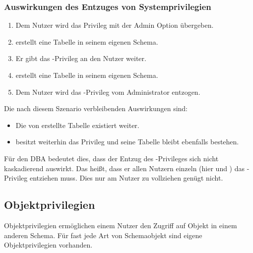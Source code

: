         \subsubsection{Auswirkungen des Entzuges von Systemprivilegien}
          \begin{enumerate}
            \item Dem Nutzer  wird das Privileg  mit der Admin Option \"ubergeben.
            \item {} erstellt eine Tabelle in seinem eigenen Schema.
            \item Er gibt das -Privileg an den Nutzer  weiter.
            \item {} erstellt eine Tabelle in seinem eigenen Schema.
            \item Dem Nutzer  wird das -Privileg vom Administrator entzogen.
          \end{enumerate}
          Die nach diesem Szenario verbleibenden Auswirkungen sind:
          \begin{itemize}
            \item Die von  erstellte Tabelle existiert weiter.
            \item {} besitzt weiterhin das Privileg  und seine Tabelle bleibt ebenfalls bestehen.
          \end{itemize}
          F\"ur den DBA bedeutet dies, dass der Entzug des -Privileges sich nicht kaskadierend auswirkt. Das hei\ss{}t, dass er allen Nutzern einzeln (hier  und ) das -Privileg entziehen muss. Dies nur am Nutzer  zu vollziehen gen\"ugt nicht.
      \subsection{Objektprivilegien}
        \begin{merke}
          Objektprivilegien erm\"oglichen einem Nutzer den Zugriff auf Objekt in einem anderen Schema. F\"ur fast jede Art von Schemaobjekt sind eigene Objektprivilegien vorhanden.
        \end{merke}

